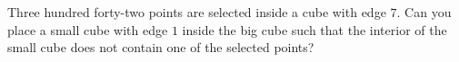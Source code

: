 Three hundred forty-two points are selected inside a cube with edge $7$. Can you place a small cube with edge $1$ inside the big cube such that the interior of the small cube does not contain one of the selected points?
